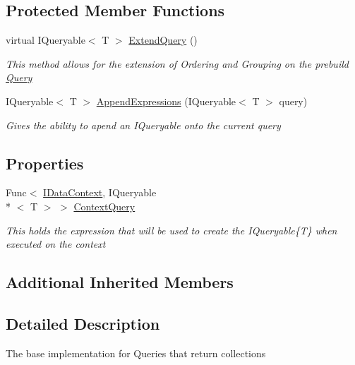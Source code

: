 \subsection*{Protected Member Functions}
\begin{DoxyCompactItemize}
\item 
virtual I\-Queryable$<$ T $>$ \hyperlink{class_highway_1_1_data_1_1_query_objects_1_1_query-g_a4c84387155c4c9eb66ffadec6169fb5c}{Extend\-Query} ()
\begin{DoxyCompactList}\small\item\em This method allows for the extension of Ordering and Grouping on the prebuild \hyperlink{class_highway_1_1_data_1_1_query_objects_1_1_query-g}{Query} \end{DoxyCompactList}\item 
I\-Queryable$<$ T $>$ \hyperlink{class_highway_1_1_data_1_1_query_objects_1_1_query-g_ad83e665a02845faedd4fbe821f16f48f}{Append\-Expressions} (I\-Queryable$<$ T $>$ query)
\begin{DoxyCompactList}\small\item\em Gives the ability to apend an I\-Queryable onto the current query \end{DoxyCompactList}\end{DoxyCompactItemize}
\subsection*{Properties}
\begin{DoxyCompactItemize}
\item 
Func$<$ \hyperlink{interface_highway_1_1_data_1_1_interfaces_1_1_i_data_context}{I\-Data\-Context}, I\-Queryable\\*
$<$ T $>$ $>$ \hyperlink{class_highway_1_1_data_1_1_query_objects_1_1_query-g_a68ecc8e5735dee1db60782614427cbbf}{Context\-Query}
\begin{DoxyCompactList}\small\item\em This holds the expression that will be used to create the I\-Queryable\{\-T\} when executed on the context \end{DoxyCompactList}\end{DoxyCompactItemize}
\subsection*{Additional Inherited Members}


\subsection{Detailed Description}
The base implementation for Queries that return collections 


